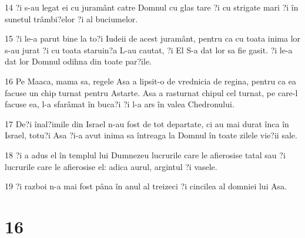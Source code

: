 \par 14 ?i s-au legat ei cu juramânt catre Domnul cu glas tare ?i cu strigate mari ?i în sunetul trâmbi?elor ?i al buciumelor.
\par 15 ?i le-a parut bine la to?i Iudeii de acest juramânt, pentru ca cu toata inima lor s-au jurat ?i cu toata staruin?a L-au cautat, ?i El S-a dat lor sa fie gasit. ?i le-a dat lor Domnul odihna din toate par?ile.
\par 16 Pe Maaca, mama sa, regele Asa a lipsit-o de vrednicia de regina, pentru ca ea facuse un chip turnat pentru Astarte. Asa a rasturnat chipul cel turnat, pe care-l facuse ea, l-a sfarâmat în buca?i ?i l-a ars în valea Chedronului.
\par 17 De?i înal?imile din Israel n-au fost de tot departate, ci au mai durat înca în Israel, totu?i Asa ?i-a avut inima sa întreaga la Domnul în toate zilele vie?ii sale.
\par 18 ?i a adus el în templul lui Dumnezeu lucrurile care le afierosise tatal sau ?i lucrurile care le afierosise el: adica aurul, argintul ?i vasele.
\par 19 ?i razboi n-a mai fost pâna în anul al treizeci ?i cincilea al domniei lui Asa.

\chapter{16}

